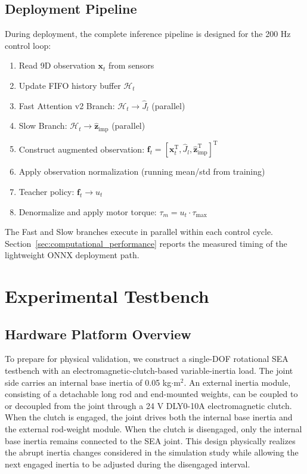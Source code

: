 \documentclass[letterpaper,journal]{IEEEtran}
\begin{document}
\subsection{Deployment Pipeline}

During deployment, the complete inference pipeline is designed for the 200 Hz control loop:
\begin{enumerate}
\item Read 9D observation $\bm{x}_t$ from sensors
\item Update FIFO history buffer $\mathcal{H}_t$
\item Fast Attention v2 Branch: $\mathcal{H}_t \rightarrow \hat{J}_l$ (parallel)
\item Slow Branch: $\mathcal{H}_t \rightarrow \hat{\bm{z}}_{\text{imp}}$ (parallel)
\item Construct augmented observation: $\bm{f}_t = [\bm{x}_t^\mathrm{T}, \hat{J}_l, \hat{\bm{z}}_{\text{imp}}^\mathrm{T}]^\mathrm{T}$
\item Apply observation normalization (running mean/std from training)
\item Teacher policy: $\bm{f}_t \rightarrow u_t$
\item Denormalize and apply motor torque: $\tau_m = u_t \cdot \tau_{\max}$
\end{enumerate}

The Fast and Slow branches execute in parallel within each control cycle. Section~\ref{sec:computational_performance} reports the measured timing of the lightweight ONNX deployment path.



\section{Experimental Testbench}
\label{sec:testbench}

\subsection{Hardware Platform Overview}

To prepare for physical validation, we construct a single-DOF rotational SEA testbench with an electromagnetic-clutch-based variable-inertia load. The joint side carries an internal base inertia of 0.05 kg$\cdot$m$^2$. An external inertia module, consisting of a detachable long rod and end-mounted weights, can be coupled to or decoupled from the joint through a 24 V DLY0-10A electromagnetic clutch. When the clutch is engaged, the joint drives both the internal base inertia and the external rod-weight module. When the clutch is disengaged, only the internal base inertia remains connected to the SEA joint. This design physically realizes the abrupt inertia changes considered in the simulation study while allowing the next engaged inertia to be adjusted during the disengaged interval.
\end{document}
